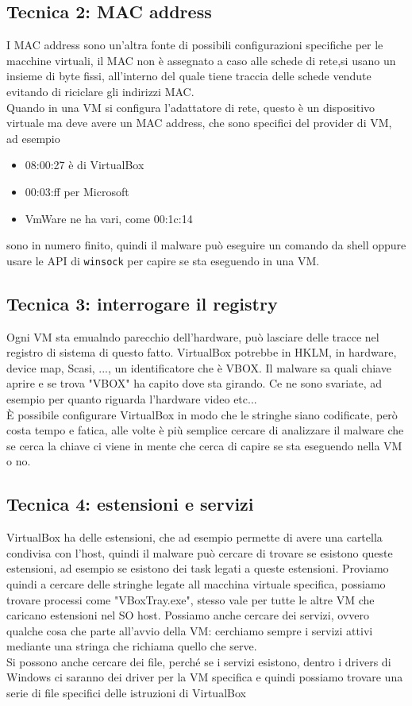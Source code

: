 \documentclass[12pt, oneside]{extbook}
\begin{document}
\subsection{Tecnica 2: MAC address}
I MAC address sono un'altra fonte di possibili configurazioni specifiche per le macchine virtuali, il MAC non è assegnato a caso alle schede di rete,si usano un insieme di byte fissi, all'interno del quale tiene traccia delle schede vendute evitando di riciclare gli indirizzi MAC.\\Quando in una VM si configura l'adattatore di rete, questo è un dispositivo virtuale ma deve avere un MAC address, che sono specifici del provider di VM, ad esempio 
\begin{itemize}
\item 08:00:27 è di VirtualBox
\item 00:03:ff per Microsoft
\item VmWare ne ha vari, come 00:1c:14
\end{itemize}
sono in numero finito, quindi il malware può eseguire un comando da shell oppure usare le API di \texttt{winsock} per capire se sta eseguendo in una VM.
\subsection{Tecnica 3: interrogare il registry} 
Ogni VM sta emualndo parecchio dell'hardware, può lasciare delle tracce nel registro di sistema di questo fatto. VirtualBox potrebbe in HKLM, in hardware, device map, Scasi, ..., un identificatore che è VBOX. Il malware sa quali chiave aprire e se trova "VBOX" ha capito dove sta girando. Ce ne sono svariate, ad esempio per quanto riguarda l'hardware video etc...\\È possibile configurare VirtualBox in modo che le stringhe siano codificate, però costa tempo e fatica, alle volte è più semplice cercare di analizzare il malware che se cerca la chiave ci viene in mente che cerca di capire se sta eseguendo nella VM o no.
\subsection{Tecnica 4: estensioni e servizi}
VirtualBox ha delle estensioni, che ad esempio permette di avere una cartella condivisa con l'host, quindi il malware può cercare di trovare se esistono queste estensioni, ad esempio se esistono dei task legati a queste estensioni. Proviamo quindi a cercare delle stringhe legate all macchina virtuale specifica, possiamo trovare processi come "VBoxTray.exe", stesso vale per tutte le altre VM che caricano estensioni nel SO host. Possiamo anche cercare dei servizi, ovvero qualche cosa che parte all'avvio della VM: cerchiamo sempre i servizi attivi mediante una stringa che richiama quello che serve.\\Si possono anche cercare dei file, perché se i servizi esistono, dentro i drivers di Windows ci saranno dei driver per la VM specifica e quindi possiamo trovare una serie di file specifici delle istruzioni di VirtualBox
\end{document}
